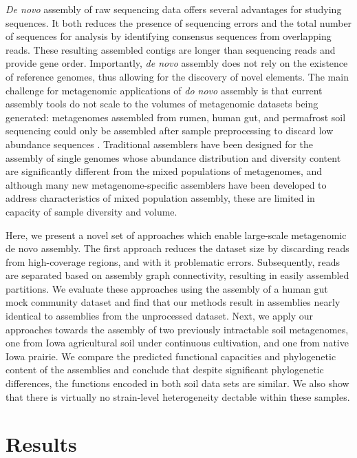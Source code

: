 \documentclass[11pt]{article} %
\begin{document}
\emph{De novo} assembly of raw sequencing data offers several
advantages for studying sequences.  It both reduces the
presence of sequencing errors and the total number of sequences for
analysis by identifying consensus sequences from overlapping reads.
These resulting assembled contigs are longer than sequencing reads and
provide gene order.  Importantly, \emph{de novo} assembly does not
rely on the existence of reference genomes, thus allowing for the
discovery of novel elements.  The main challenge for metagenomic
applications of \emph{do novo} assembly is that current assembly tools
do not scale to the volumes of metagenomic datasets being generated:
metagenomes assembled from rumen, human gut, and permafrost soil
sequencing could only be assembled after sample preprocessing to
discard low abundance sequences
\cite{Hess:2011p686,Mackelprang:2011p1087,Qin:2010p189}.  Traditional
assemblers have been designed for the assembly of single genomes whose
abundance distribution and diversity content are significantly
different from the mixed populations of metagenomes, and although many
new metagenome-specific assemblers have been developed to address
characteristics of mixed population assembly, these are limited in
capacity of sample diversity and volume.

Here, we present a novel set of approaches which enable large-scale
metagenomic de novo assembly.  The first approach reduces the dataset
size by discarding reads from high-coverage regions, and with it
problematic errors.  Subsequently, reads are separated based on
assembly graph connectivity, resulting in easily assembled partitions.
We evaluate these approaches using the assembly of a human gut mock
community dataset and find that our methods result in assemblies
nearly identical to assemblies from the unprocessed dataset.  Next, we
apply our approaches towards the assembly of two previously
intractable soil metagenomes, one from Iowa agricultural soil under
continuous cultivation, and one from native Iowa prairie.  We compare
the predicted functional capacities and phylogenetic content of the
assemblies and conclude that despite significant phylogenetic
differences, the functions encoded in both soil data sets are similar.
We also show that there is virtually no strain-level heterogeneity
dectable within these samples.

\section{Results}
\end{document}
